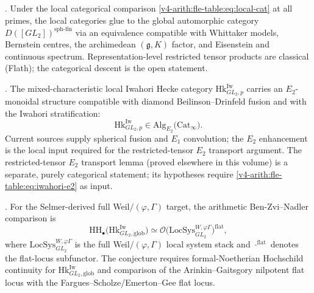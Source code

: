 \begin{conjecture}
\label{v4-arith:fle-table:conj:adelic-descent}
\ClaimStatusConjectured.
Under the local categorical comparison
\eqref{v4-arith:fle-table:eq:local-cat} at all primes, the local
categories glue to the global automorphic category
\(D([GL_{2}])^{\mathrm{sph\text{-}fin}}\) via an equivalence
compatible with Whittaker models, Bernstein centres, the archimedean
\((\mathfrak{g},K)\) factor, and Eisenstein and continuous spectrum.
Representation-level restricted tensor products are classical
(Flath); the categorical descent is the open statement.
\end{conjecture}

\begin{conjecture}
\label{v4-arith:fle-table:conj:iwahori-e2}
\ClaimStatusConjectured. The mixed-characteristic local Iwahori
Hecke category
\(\mathrm{Hk}^{\mathrm{Iw}}_{GL_{2},p}\)
carries an \(E_{2}\)-monoidal structure compatible with diamond
Beilinson--Drinfeld fusion and with the Iwahori stratification:
\begin{equation}
\label{v4-arith:fle-table:eq:iwahori-e2}
\mathrm{Hk}^{\mathrm{Iw}}_{GL_{2},p}
\in
\mathrm{Alg}_{E_{2}}\bigl(\mathrm{Cat}_{\infty}\bigr).
\end{equation}
Current sources supply spherical fusion and \(E_{1}\) convolution; the
\(E_{2}\) enhancement is the local input required for the
restricted-tensor \(E_{2}\) transport argument. The restricted-tensor
\(E_{2}\) transport lemma (proved elsewhere in this volume)
is a separate, purely categorical statement; its hypotheses require
\eqref{v4-arith:fle-table:eq:iwahori-e2} as input.
\end{conjecture}

\begin{conjecture}
\label{v4-arith:fle-table:conj:full-bzn}
\ClaimStatusConjectured.
For the Selmer-derived full Weil\(/(\varphi,\Gamma)\) target, the
arithmetic Ben-Zvi--Nadler comparison is
\begin{equation}
\label{v4-arith:fle-table:eq:bzn}
\mathrm{HH}_{\bullet}\bigl(\mathrm{Hk}^{\mathrm{Iw}}_{GL_{2},\mathrm{glob}}\bigr)
\simeq
\mathcal{O}\bigl(\mathrm{LocSys}^{W,\varphi\Gamma}_{GL_{2}}\bigr)^{\mathrm{flat}},
\end{equation}
where \(\mathrm{LocSys}^{W,\varphi\Gamma}_{GL_{2}}\) is the full
Weil\(/(\varphi,\Gamma)\) local system stack and
\({\cdot}^{\mathrm{flat}}\) denotes the flat-locus subfunctor.
The conjecture requires formal-Noetherian Hochschild continuity for
\(\mathrm{Hk}^{\mathrm{Iw}}_{GL_{2},\mathrm{glob}}\) and
comparison of the Arinkin--Gaitsgory nilpotent flat locus with the
Fargues--Scholze/Emerton--Gee flat locus.
\end{conjecture}

